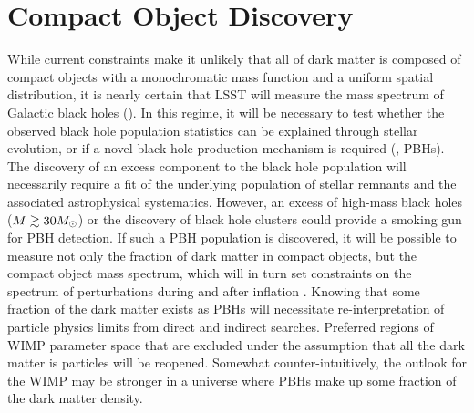 \section{Compact Object Discovery}
\label{sec:pbh_discovery}

While current constraints make it unlikely that all of dark matter is composed of compact objects with a monochromatic mass function and a uniform spatial distribution, it is nearly certain that LSST will measure the mass spectrum of Galactic black holes ().
In this regime, it will be necessary to test whether the observed black hole population statistics can be explained through stellar evolution, or if a novel black hole production mechanism is required (\ie, PBHs).
The discovery of an excess component to the black hole population will necessarily require a fit of the underlying population of stellar remnants and the associated astrophysical systematics. 
However, an excess of high-mass black holes ($M \gtrsim 30M_\odot$) or the discovery of black hole clusters \citep[\eg,][]{1603.05234} could provide a smoking gun for PBH detection.
If such a PBH population is discovered, it will be possible to measure not only the fraction of dark matter in compact objects, but the compact object mass spectrum, which will in turn set constraints on the spectrum of perturbations during and after inflation \citep[\eg,][]{1702.03901}.
Knowing that some fraction of the dark matter exists as PBHs will necessitate re-interpretation of particle physics limits from direct and indirect searches.
Preferred regions of WIMP parameter space that are excluded under the assumption that all the dark matter is particles will be reopened.
Somewhat counter-intuitively, the outlook for the WIMP may be stronger in a universe where PBHs make up some fraction of the dark matter density.

